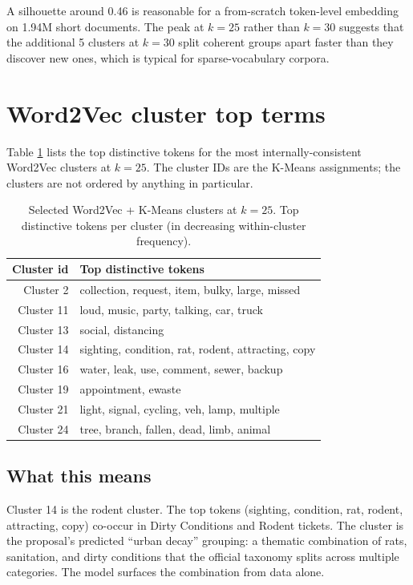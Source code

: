 \documentclass[11pt,letterpaper]{book}
\begin{document}
A silhouette around 0.46 is reasonable for a from-scratch token-level embedding on 1.94M short documents. The peak at $k = 25$ rather than $k = 30$ suggests that the additional 5 clusters at $k = 30$ split coherent groups apart faster than they discover new ones, which is typical for sparse-vocabulary corpora.

\section{Word2Vec cluster top terms}
\label{sec:results-w2v-clusters}

Table \ref{tab:w2v-clusters} lists the top distinctive tokens for the most internally-consistent Word2Vec clusters at $k = 25$. The cluster IDs are the K-Means assignments; the clusters are not ordered by anything in particular.

\begin{table}[h]
  \caption{Selected Word2Vec + K-Means clusters at $k = 25$. Top distinctive tokens per cluster (in decreasing within-cluster frequency).}
  \label{tab:w2v-clusters}
  \centering
  \small
  \begin{tabular}{rl}
    \toprule
    Cluster id & Top distinctive tokens \\
    \midrule
    Cluster 2  & collection, request, item, bulky, large, missed \\
    Cluster 11 & loud, music, party, talking, car, truck \\
    Cluster 13 & social, distancing \\
    Cluster 14 & sighting, condition, rat, rodent, attracting, copy \\
    Cluster 16 & water, leak, use, comment, sewer, backup \\
    Cluster 19 & appointment, ewaste \\
    Cluster 21 & light, signal, cycling, veh, lamp, multiple \\
    Cluster 24 & tree, branch, fallen, dead, limb, animal \\
    \bottomrule
  \end{tabular}
\end{table}

\subsection*{What this means}

Cluster 14 is the rodent cluster. The top tokens (sighting, condition, rat, rodent, attracting, copy) co-occur in Dirty Conditions and Rodent tickets. The cluster is the proposal's predicted ``urban decay'' grouping: a thematic combination of rats, sanitation, and dirty conditions that the official taxonomy splits across multiple categories. The model surfaces the combination from data alone.
\end{document}

